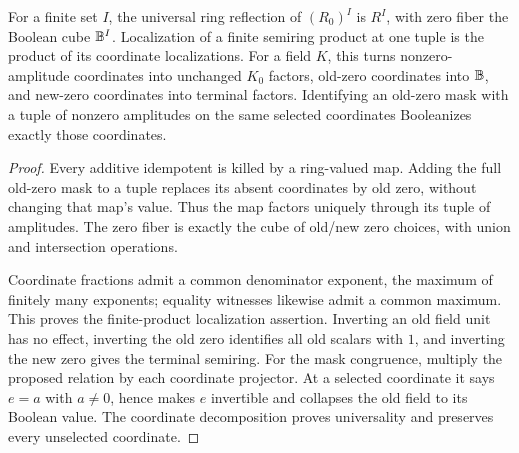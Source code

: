 \begin{proposition}\label{prop:finite-product-reflections}
For a finite set $I$, the universal ring reflection of $(R_0)^I$ is $R^I$,
with zero fiber the Boolean cube $\mathbb B^I$. Localization of a finite semiring
product at one tuple is the product of its coordinate localizations.
For a field $K$, this turns nonzero-amplitude coordinates into unchanged
$K_0$ factors, old-zero coordinates into $\mathbb B$, and new-zero coordinates
into terminal factors. Identifying an old-zero mask with a tuple of
nonzero amplitudes on the same selected coordinates Booleanizes exactly
those coordinates.
\end{proposition}
\begin{proof}
Every additive idempotent is killed by a ring-valued map. Adding the full
old-zero mask to a tuple replaces its absent coordinates by old zero,
without changing that map's value. Thus the map factors uniquely through
its tuple of amplitudes. The zero fiber is exactly the cube of old/new
zero choices, with union and intersection operations.

Coordinate fractions admit a common denominator exponent, the maximum of
finitely many exponents; equality witnesses likewise admit a common
maximum. This proves the finite-product localization assertion. Inverting
an old field unit has no effect, inverting the old zero identifies all old
scalars with $1$, and inverting the new zero gives the terminal semiring.
For the mask congruence, multiply the proposed relation by each coordinate
projector. At a selected coordinate it says $e=a$ with $a\ne0$, hence makes
$e$ invertible and collapses the old field to its Boolean value. The
coordinate decomposition proves universality and preserves every
unselected coordinate.
\end{proof}

